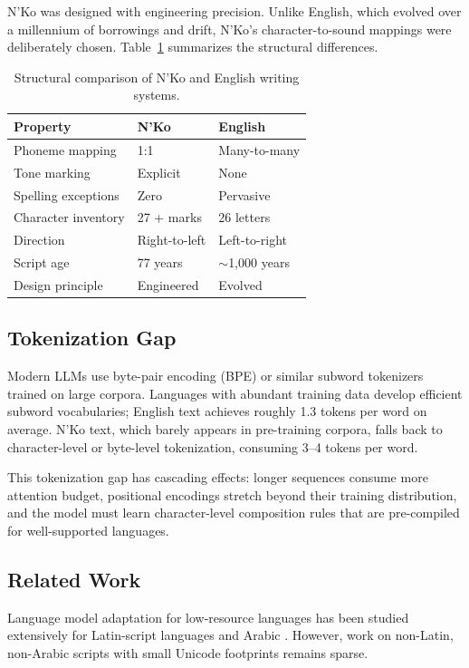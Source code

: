 \documentclass[11pt]{article}
\begin{document}
N'Ko was designed with engineering precision.
Unlike English, which evolved over a millennium of borrowings and drift, N'Ko's character-to-sound mappings were deliberately chosen.
Table~\ref{tab:nko-vs-english} summarizes the structural differences.

\begin{table}[t]
\centering
\small
\begin{tabular}{lll}
\toprule
\textbf{Property} & \textbf{N'Ko} & \textbf{English} \\
\midrule
Phoneme mapping & 1:1 & Many-to-many \\
Tone marking & Explicit & None \\
Spelling exceptions & Zero & Pervasive \\
Character inventory & 27 + marks & 26 letters \\
Direction & Right-to-left & Left-to-right \\
Script age & 77 years & $\sim$1,000 years \\
Design principle & Engineered & Evolved \\
\bottomrule
\end{tabular}
\caption{Structural comparison of N'Ko and English writing systems.}
\label{tab:nko-vs-english}
\end{table}

\subsection{Tokenization Gap}

Modern LLMs use byte-pair encoding (BPE) or similar subword tokenizers trained on large corpora.
Languages with abundant training data develop efficient subword vocabularies; English text achieves roughly 1.3 tokens per word on average.
N'Ko text, which barely appears in pre-training corpora, falls back to character-level or byte-level tokenization, consuming 3--4 tokens per word.

This tokenization gap has cascading effects: longer sequences consume more attention budget, positional encodings stretch beyond their training distribution, and the model must learn character-level composition rules that are pre-compiled for well-supported languages.

\subsection{Related Work}

Language model adaptation for low-resource languages has been studied extensively for Latin-script languages \cite{conneau2020unsupervised, pfeiffer2020adapterhub} and Arabic \cite{antoun2020arabert}.
However, work on non-Latin, non-Arabic scripts with small Unicode footprints remains sparse.
\end{document}
